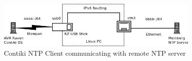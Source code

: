 \begin{figure}
	\centering
	\includegraphics[width=10cm,keepaspectratio]{fig/radvd-routing.png}
	\caption{Contiki NTP Client communicating with remote NTP server}
	\label{fig:implementation-routing}
\end{figure}
